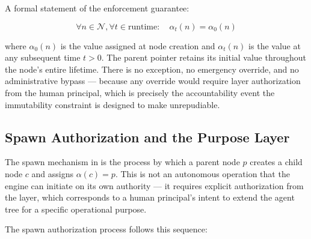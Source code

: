 A formal statement of the enforcement guarantee:

\begin{equation}
\forall n \in \mathcal{N}, \forall t \in \text{runtime}: \quad \alpha_t(n) = \alpha_0(n)
\tag{ENF-1}
\end{equation}

where $\alpha_0(n)$ is the value assigned at node creation and $\alpha_t(n)$ is the value at any subsequent time $t > 0$. The parent pointer retains its initial value throughout the node's entire lifetime. There is no exception, no emergency override, and no administrative bypass — because any override would require \purpose{} layer authorization from the human principal, which is precisely the accountability event the immutability constraint is designed to make unrepudiable.

\subsection{Spawn Authorization and the Purpose Layer}

The spawn mechanism in \bxthree{} is the process by which a parent node $p$ creates a child node $c$ and assigns $\alpha(c) = p$. This is not an autonomous operation that the \bounds{} engine can initiate on its own authority — it requires explicit authorization from the \purpose{} layer, which corresponds to a human principal's intent to extend the agent tree for a specific operational purpose.

The spawn authorization process follows this sequence:

